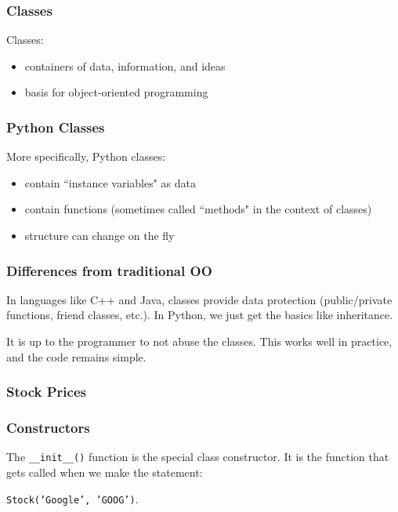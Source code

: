 \documentclass{beamer}
\begin{document}
\begin{frame}
\frametitle{Classes}

Classes:
\vspace{0.1in}
\begin{itemize}
\setlength{\itemsep}{0.1in}
\item{containers of data, information, and ideas}
\item{basis for object-oriented programming}
\end{itemize}

\end{frame}

\begin{frame}
\frametitle{Python Classes}

More specifically, Python classes:
\vspace{0.1in}
\begin{itemize}
\setlength{\itemsep}{0.1in}
\item{contain ``instance variables" as data}
\item{contain functions (sometimes called ``methods" in the context of classes)}
\item{structure can change on the fly}
\end{itemize}

\end{frame}

\begin{frame}
\frametitle{Differences from traditional OO}

In languages like C++ and Java, classes provide data protection (public/private functions, friend classes, etc.).  In Python, we just get the basics like inheritance.

\vspace{0.2in}

It is up to the programmer to not abuse the classes.  This works well in practice, and the code remains simple.

\end{frame}

\begin{frame}
\frametitle{Stock Prices}

\end{frame}


\begin{frame}
\frametitle{Constructors}

The \texttt{\_\_init\_\_()} function is the special class constructor.  It is the function that gets called when we make the statement:

\begin{center}
\texttt{Stock('Google', 'GOOG')}.
\end{center}

\end{frame}
\end{document}
